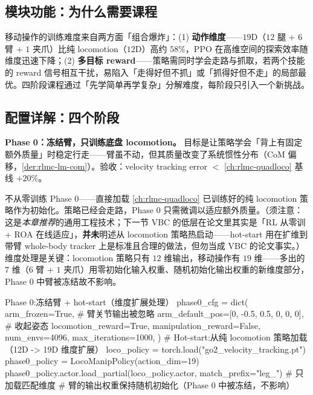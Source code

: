 \subsection{模块功能：为什么需要课程}
\label{sec:rlmc-lm-curr-why}

移动操作的训练难度来自两方面「组合爆炸」：(1) \textbf{动作维度}——$19$D（$12$ 腿 + $6$ 臂 + $1$ 夹爪）比纯 locomotion（$12$D）高约 $58\%$，PPO 在高维空间的探索效率随维度迅速下降；(2) \textbf{多目标 reward}——策略需同时学会走路与抓取，若两个技能的 reward 信号相互干扰，易陷入「走得好但不抓」或「抓得好但不走」的局部最优。四阶段课程通过「先学简单再学复杂」分解难度，每阶段只引入一个新挑战。

\subsection{配置详解：四个阶段}
\label{sec:rlmc-lm-curr-phases}

\textbf{Phase 0：冻结臂，只训练底盘 locomotion。} 目标是让策略学会「背上有固定额外质量」时稳定行走——臂虽不动，但其质量改变了系统惯性分布（CoM 偏移，\cref{der:rlmc-lm-com}）。验收：velocity tracking error $<$ \cref{ch:rlmc-quadloco} 基线 $+20\%$。

\begin{insight}\label{ins:rlmc-lm-hotstart}
不从零训练 Phase 0——直接加载 \cref{ch:rlmc-quadloco} 已训练好的纯 locomotion 策略作为初始化。策略已经会走路，Phase 0 只需微调以适应额外质量。（须注意：这是\emph{本章推荐}的通用工程技术；下一节 VBC 的低层在论文里其实是「RL 从零训 + ROA 在线适应」，\textbf{并未}明述从 locomotion 策略热启动——hot-start 用在扩维到带臂 whole-body tracker 上是标准且合理的做法，但勿当成 VBC 的论文事实。）维度处理是关键：locomotion 策略只有 $12$ 维输出，移动操作有 $19$ 维——多出的 $7$ 维（$6$ 臂 + $1$ 夹爪）用零初始化输入权重、随机初始化输出权重的新维度部分，Phase 0 中臂被冻结故不影响。
\end{insight}

\begin{codebox}[Python]{Phase 0:冻结臂 + hot-start（维度扩展处理）}
phase0_cfg = dict(
    arm_frozen=True,                              # 臂关节输出被忽略
    arm_default_pos=[0, -0.5, 0.5, 0, 0, 0],      # 收起姿态
    locomotion_reward=True, manipulation_reward=False,
    num_envs=4096, max_iterations=1000,
)
# Hot-start:从纯 locomotion 策略加载（12D -> 19D 维度扩展）
loco_policy = torch.load("go2_velocity_tracking.pt")
phase0_policy = LocoManipPolicy(action_dim=19)
phase0_policy.actor.load_partial(loco_policy.actor, match_prefix="leg_")  # 只加载匹配维度
# 臂的输出权重保持随机初始化（Phase 0 中被冻结，不影响）
\end{codebox}

